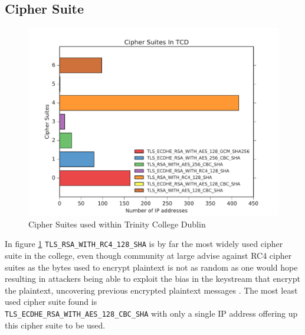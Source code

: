 \documentclass[a4wide,leqno,12pt]{report}
\begin{document}
\subsection{Cipher Suite}
\begin{figure}[H]
\centering
\includegraphics[scale=.5]{pdf_images/CipherSuitesInTCD}
\caption{Cipher Suites used within Trinity College Dublin}
\label{fig:cipherSuites}
\end{figure}

In figure \ref{fig:cipherSuites}
\texttt{TLS\_RSA\_WITH\_RC4\_128\_SHA} is by far the most widely used cipher suite in the college, even though community at large advise against RC4 cipher suites as the bytes used to encrypt plaintext is not as random as one would hope resulting in attackers being able to exploit the bias in the keystream that encrypt the plaintext, uncovering previous encrypted plaintext messages \cite{popov2015prohibiting}. The most least used cipher suite found is\\
\texttt{TLS\_ECDHE\_RSA\_WITH\_AES\_128\_CBC\_SHA} with only a single IP address offering up this cipher suite to be used.
\end{document}
